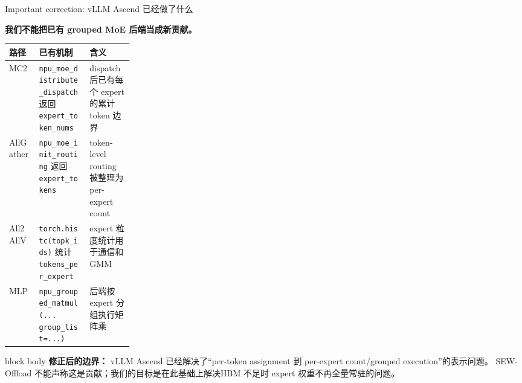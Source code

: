 \documentclass[aspectratio=169,10pt]{beamer}
\newcommand{\bluepoint}[1]{\textbf{\textcolor{MainBlue}{#1}}}
\begin{document}
\begin{frame}[t]{Important correction: vLLM Ascend 已经做了什么}
\small
\vspace{-0.45em}

\bluepoint{我们不能把已有 grouped MoE 后端当成新贡献。}

\vspace{0.55em}
\begin{tabularx}{\linewidth}{p{0.24\linewidth}X X}
\toprule
\textbf{路径} & \textbf{已有机制} & \textbf{含义} \\
\midrule
MC2 & \texttt{npu\_moe\_distribute\_dispatch} 返回 \texttt{expert\_token\_nums} & dispatch 后已有每个 expert 的累计 token 边界 \\
AllGather & \texttt{npu\_moe\_init\_routing} 返回 \texttt{expert\_tokens} & token-level routing 被整理为 per-expert count \\
All2AllV & \texttt{torch.histc(topk\_ids)} 统计 \texttt{tokens\_per\_expert} & expert 粒度统计用于通信和 GMM \\
MLP & \texttt{npu\_grouped\_matmul(... group\_list=...)} & 后端按 expert 分组执行矩阵乘 \\
\bottomrule
\end{tabularx}

\vspace{0.85em}
\begin{beamercolorbox}[wd=\linewidth,sep=0.7em,rounded=true]{block body}
\textbf{\textcolor{AccentRed}{修正后的边界：}}
vLLM Ascend 已经解决了“per-token assignment 到 per-expert count/grouped execution”的表示问题。
SEW-Offload 不能声称这是贡献；我们的目标是在此基础上解决\alert{HBM 不足时 expert 权重不再全量常驻}的问题。
\end{beamercolorbox}
\end{frame}
\end{document}
